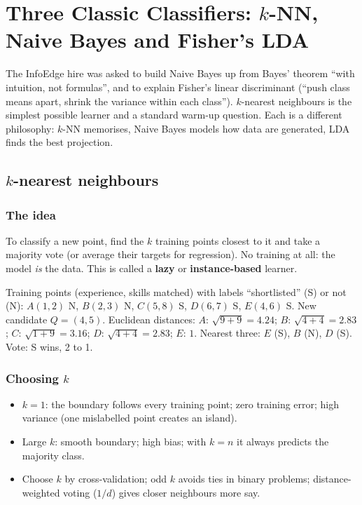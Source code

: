 \chapter{Three Classic Classifiers: $k$-NN, Naive Bayes and Fisher's LDA}

The InfoEdge hire was asked to build Naive Bayes up from Bayes' theorem ``with intuition, not formulas'', and to explain
Fisher's linear discriminant (``push class means apart, shrink the variance within each class''). $k$-nearest neighbours
is the simplest possible learner and a standard warm-up question. Each is a different philosophy: $k$-NN memorises,
Naive Bayes models how data are generated, LDA finds the best projection.

\section{$k$-nearest neighbours}

\subsection{The idea}
To classify a new point, find the $k$ training points closest to it and take a majority vote (or average their targets
for regression). No training at all: the model \emph{is} the data. This is called a \textbf{lazy} or
\textbf{instance-based} learner.

\begin{example}[: 3-NN by hand]
Training points (experience, skills matched) with labels ``shortlisted'' (S) or not (N): $A(1,2)$ N, $B(2,3)$ N,
$C(5,8)$ S, $D(6,7)$ S, $E(4,6)$ S. New candidate $Q = (4, 5)$. Euclidean distances: $A$: $\sqrt{9+9} = 4.24$; $B$:
$\sqrt{4+4} = 2.83$; $C$: $\sqrt{1+9} = 3.16$; $D$: $\sqrt{4+4} = 2.83$; $E$: $1$. Nearest three: $E$ (S), $B$ (N), $D$ (S).
Vote: S wins, 2 to 1.
\end{example}

\subsection{Choosing $k$}
\begin{itemize}
\item $k = 1$: the boundary follows every training point; zero training error; high variance (one mislabelled point
  creates an island).
\item Large $k$: smooth boundary; high bias; with $k = n$ it always predicts the majority class.
\item Choose $k$ by cross-validation; odd $k$ avoids ties in binary problems; distance-weighted voting ($1/d$) gives
  closer neighbours more say.
\end{itemize}

